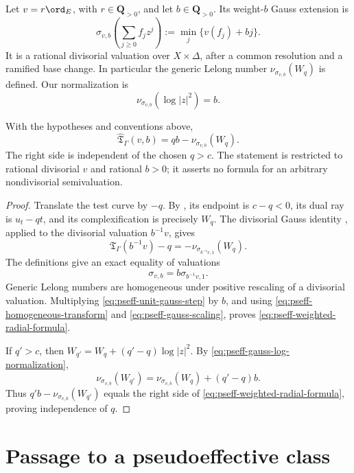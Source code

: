 Let $v=r\ord_E$, with $r\in\mathbf Q_{>0}$, and let
$b\in\mathbf Q_{>0}$.  Its weight-$b$ Gauss extension is
\[
 \sigma_{v,b}\!\left(\sum_{j\geq0}f_jz^j\right)
 :=\min_j\{v(f_j)+bj\}.
\tag{71.22}\label{eq:pseff-weighted-gauss}
\]
It is a rational divisorial valuation over $X\times\Delta$, after a
common resolution and a ramified base change.  In particular the generic
Lelong number $\nu_{\sigma_{v,b}}(W_q)$ is defined.  Our normalization is
\[
                  \nu_{\sigma_{v,b}}(\log|z|^2)=b.
\tag{71.23}\label{eq:pseff-gauss-log-normalization}
\]

\begin{proposition}\label{prop:pseff-weighted-radial-formula}
With the hypotheses and conventions above,
\[
 \widehat{\mathfrak T}_\Gamma(v,b)
 =qb-\nu_{\sigma_{v,b}}(W_q).
\tag{71.24}\label{eq:pseff-weighted-radial-formula}
\]
The right side is independent of the chosen $q>c$.
The statement is restricted to rational divisorial $v$ and rational
$b>0$; it asserts no formula for an arbitrary nondivisorial
semivaluation.
\end{proposition}

\begin{proof}
Translate the test curve by $-q$.  By
, its endpoint is $c-q<0$, its
dual ray is $u_t-qt$, and its complexification is precisely $W_q$.
The divisorial Gauss identity \cite[Proposition~3.1]{DXZ23}, applied to
the divisorial valuation
$b^{-1}v$, gives
\[
 \mathfrak T_\Gamma(b^{-1}v)-q
 =-\nu_{\sigma_{b^{-1}v,1}}(W_q).
\tag{71.25}\label{eq:pseff-unit-gauss-step}
\]
The definitions give an exact equality of valuations
\[
                 \sigma_{v,b}=b\sigma_{b^{-1}v,1}.
\tag{71.26}\label{eq:pseff-gauss-scaling}
\]
Generic Lelong numbers are homogeneous under positive rescaling of a
divisorial valuation.  Multiplying \eqref{eq:pseff-unit-gauss-step} by
$b$, and using \eqref{eq:pseff-homogeneous-transform} and
\eqref{eq:pseff-gauss-scaling}, proves
\eqref{eq:pseff-weighted-radial-formula}.

If $q'>c$, then
$W_{q'}=W_q+(q'-q)\log|z|^2$.  By
\eqref{eq:pseff-gauss-log-normalization},
\[
 \nu_{\sigma_{v,b}}(W_{q'})
 =\nu_{\sigma_{v,b}}(W_q)+(q'-q)b.
\]
Thus $q'b-\nu_{\sigma_{v,b}}(W_{q'})$ equals the right side of
\eqref{eq:pseff-weighted-radial-formula}, proving independence of $q$.
\end{proof}

\section{Passage to a pseudoeffective class}
\label{sec:pseff-inverse-system}

